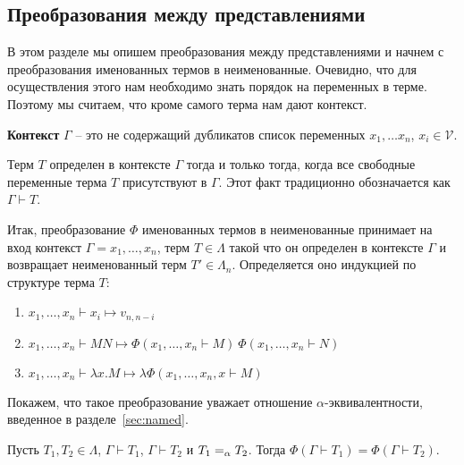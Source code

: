 \subsection{Преобразования между представлениями}
\label{sec:conversions}
В этом разделе мы опишем преобразования между представлениями и начнем с преобразования именованных термов в неименованные. Очевидно, что для осуществления этого нам необходимо знать порядок на переменных в терме. Поэтому мы считаем, что кроме самого терма нам дают контекст.

\begin{definition}
  \textbf{Контекст} $\Gamma$ -- это не содержащий дубликатов список переменных $x_{1}, \dots x_{n}$, $x_{i} \in \mathcal{V}$.
\end{definition}

\begin{definition}
  Терм $T$ определен в контексте $\Gamma$ тогда и только тогда, когда все свободные переменные терма $T$ присутствуют в $\Gamma$. Этот факт традиционно обозначается как $\Gamma \vdash T$.
\end{definition}

Итак, преобразование $\Phi$ именованных термов в неименованные принимает на вход контекст $\Gamma = x_{1}, \dots, x_{n}$, терм $T \in \Lambda$  такой что он определен в контексте $\Gamma$ и возвращает неименованный терм $T' \in \Lambda_{n}$. Определяется оно индукцией по структуре терма $T$:

\begin{enumerate}
  \item $x_{1}, \dots, x_{n} \vdash x_{i} \mapsto v_{n, n - i}$
  \item $x_{1}, \dots, x_{n} \vdash M N \mapsto \Phi(x_{1}, \dots, x_{n} \vdash M)\ \Phi(x_{1}, \dots, x_{n} \vdash N)$
  \item $x_{1}, \dots, x_{n} \vdash \lambda x.M \mapsto \lambda \Phi(x_{1}, \dots, x_{n} , x \vdash M)$
\end{enumerate}

Покажем, что такое преобразование уважает отношение $\alpha$-эквивалентности, введенное в разделе~\ref{sec:named}.

\begin{prop}
  Пусть $T_{1}, T_{2} \in \Lambda$, $\Gamma \vdash T_{1}$, $\Gamma \vdash T_{2}$ и $T_{1} =_{\alpha} T_{2}$. Тогда $\Phi(\Gamma \vdash T_{1}) = \Phi(\Gamma \vdash T_{2})$.
\end{prop}

